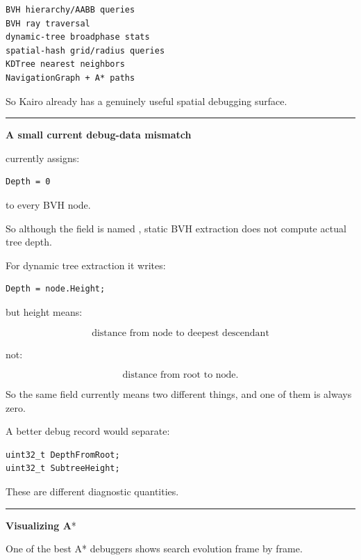 \begin{verbatim}
BVH hierarchy/AABB queries
BVH ray traversal
dynamic-tree broadphase stats
spatial-hash grid/radius queries
KDTree nearest neighbors
NavigationGraph + A* paths
\end{verbatim}

So Kairo already has a genuinely useful spatial debugging surface.

\begin{center}\rule{0.5\linewidth}{0.5pt}\end{center}

\textbf{A small current debug-data mismatch}

 currently assigns:

\begin{verbatim}
Depth = 0
\end{verbatim}

to every BVH node.

So although the field is named , static BVH extraction does not compute actual tree depth.

For dynamic tree extraction it writes:

\begin{verbatim}
Depth = node.Height;
\end{verbatim}

but height means:

\[
\text{distance from node to deepest descendant}
\]

not:

\[
\text{distance from root to node}.
\]

So the same field currently means two different things, and one of them is always zero.

A better debug record would separate:

\begin{verbatim}
uint32_t DepthFromRoot;
uint32_t SubtreeHeight;
\end{verbatim}

These are different diagnostic quantities.

\begin{center}\rule{0.5\linewidth}{0.5pt}\end{center}

\textbf{Visualizing A}*

One of the best A* debuggers shows search evolution frame by frame.

